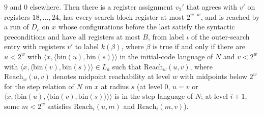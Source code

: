 \begin{theorem}
$9$ and $0$ elsewhere. Then there is a register assignment $v_2'$ that agrees with $v'$ on registers
$18,\dots,24$, has every search-block register at most $2^{w\cdot w}$, and is reached by a run of
$D_c$ on $x$ whose configurations before the last satisfy the syntactic preconditions and have all
registers at most $B$, from label $\iota$ of the outer-search entry with registers $v'$ to label
$k(\beta)$, where $\beta$ is true if and only if there are $u<2^w$ with
$\langle x,\langle\mathrm{bin}(u),\mathrm{bin}(s)\rangle\rangle$ in the initial-code language of $N$
and $v<2^w$ with $\langle x,\langle\mathrm{bin}(v),\mathrm{bin}(s)\rangle\rangle\in L_a$ such that
$\mathrm{Reach}_w(u,v)$, where $\mathrm{Reach}_w(u,v)$ denotes midpoint reachability at level $w$ with midpoints below $2^w$ for the step relation of $N$ on $x$ at radius $s$ (at level $0$, $u=v$ or $\langle x,\langle \mathrm{bin}(u),\langle \mathrm{bin}(v),\mathrm{bin}(s)\rangle\rangle\rangle$ is in the step language of $N$; at level $i+1$, some $m<2^w$ satisfies $\mathrm{Reach}_i(u,m)$ and $\mathrm{Reach}_i(m,v)$).
\end{theorem}

